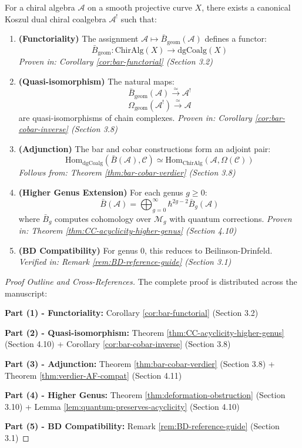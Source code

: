 \begin{maintheorem}\label{mainthm:bar-cobar-complete}
For a chiral algebra $\mathcal{A}$ on a smooth projective curve $X$, there exists a 
canonical Koszul dual chiral coalgebra $\mathcal{A}^!$ such that:

\begin{enumerate}
\item \textbf{(Functoriality)} The assignment $\mathcal{A} \mapsto \bar{B}_{\text{geom}}(\mathcal{A})$ 
defines a functor:
$$\bar{B}_{\text{geom}}: \text{ChirAlg}(X) \to \text{dgCoalg}(X)$$
\textit{Proven in: Corollary \ref{cor:bar-functorial} (Section 3.2)}

\item \textbf{(Quasi-isomorphism)} The natural maps:
$$\bar{B}_{\text{geom}}(\mathcal{A}) \xrightarrow{\simeq} \mathcal{A}^!$$
$$\Omega_{\text{geom}}(\mathcal{A}^!) \xrightarrow{\simeq} \mathcal{A}$$
are quasi-isomorphisms of chain complexes.
\textit{Proven in: Corollary \ref{cor:bar-cobar-inverse} (Section 3.8)}

\item \textbf{(Adjunction)} The bar and cobar constructions form an adjoint pair:
$$\text{Hom}_{\text{dgCoalg}}(\bar{B}(\mathcal{A}), \mathcal{C}) 
\simeq \text{Hom}_{\text{ChirAlg}}(\mathcal{A}, \Omega(\mathcal{C}))$$
\textit{Follows from: Theorem \ref{thm:bar-cobar-verdier} (Section 3.8)}

\item \textbf{(Higher Genus Extension)} For each genus $g \geq 0$:
$$\bar{B}(\mathcal{A}) = \bigoplus_{g=0}^{\infty} \hbar^{2g-2} \bar{B}_g(\mathcal{A})$$
where $\bar{B}_g$ computes cohomology over $\mathcal{M}_g$ with quantum corrections.
\textit{Proven in: Theorem \ref{thm:CC-acyclicity-higher-genus} (Section 4.10)}

\item \textbf{(BD Compatibility)} For genus 0, this reduces to Beilinson-Drinfeld.
\textit{Verified in: Remark \ref{rem:BD-reference-guide} (Section 3.1)}
\end{enumerate}
\end{maintheorem}

\begin{proof}[Proof Outline and Cross-References]
The complete proof is distributed across the manuscript:

\textbf{Part (1) - Functoriality:}
Corollary \ref{cor:bar-functorial} (Section 3.2)

\textbf{Part (2) - Quasi-isomorphism:}
Theorem \ref{thm:CC-acyclicity-higher-genus} (Section 4.10) + Corollary \ref{cor:bar-cobar-inverse} (Section 3.8)

\textbf{Part (3) - Adjunction:}
Theorem \ref{thm:bar-cobar-verdier} (Section 3.8) + Theorem \ref{thm:verdier-AF-compat} (Section 4.11)

\textbf{Part (4) - Higher Genus:}
Theorem \ref{thm:deformation-obstruction} (Section 3.10) + Lemma \ref{lem:quantum-preserves-acyclicity} (Section 4.10)

\textbf{Part (5) - BD Compatibility:}
Remark \ref{rem:BD-reference-guide} (Section 3.1)
\end{proof}

